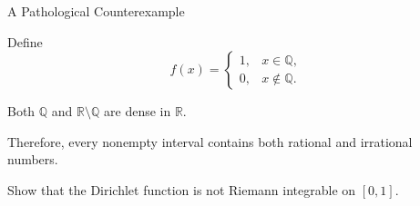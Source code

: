 \documentclass[12pt,a4paper]{article}
\begin{document}
\clearpage


\begin{heading}
A Pathological Counterexample
\end{heading}

\begin{definition}
Define
\[
f(x)=
\begin{cases}
1, & x\in\mathbb{Q},\\
0, & x\notin\mathbb{Q}.
\end{cases}
\]
\end{definition}

Both $\mathbb{Q}$ and $\mathbb{R}\setminus\mathbb{Q}$ are dense in
$\mathbb{R}$.

Therefore, every nonempty interval contains both rational and
irrational numbers.

\vspace{15pt}

\begin{problem}
Show that the Dirichlet function is not Riemann integrable on $[0,1]$.
\end{problem}

\clearpage


\EndPage
\end{document}
